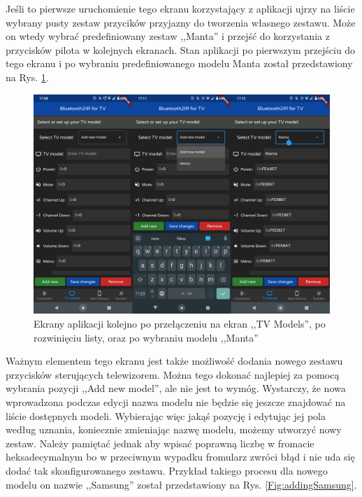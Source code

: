 \documentclass[12pt,twoside]{article}
\begin{document}
Jeśli to pierwsze uruchomienie tego ekranu korzystający z aplikacji ujrzy na liście wybrany pusty zestaw przycików przyjazny do tworzenia własnego zestawu. Może on wtedy wybrać predefiniowany zestaw ,,Manta'' i przejść do korzystania z przycisków pilota w kolejnych ekranach. Stan aplikacji po pierwszym przejściu do tego ekranu i po wybraniu predefiniowanego modelu Manta został przedstawiony na Rys. \ref*{Fig:choosingManta}.
\begin{figure}[ht]
   \centering
   \includegraphics[width=13cm]{images/choosingManta.png}
   \caption{Ekrany aplikacji kolejno po przełączeniu na ekran ,,TV Models'', po rozwinięciu listy, oraz po wybraniu modelu ,,Manta''}
   \label{Fig:choosingManta}
\end{figure}

Ważnym elementem tego ekranu jest także możliwość dodania nowego zestawu przycisków sterujących telewizorem. Można tego dokonać najlepiej za pomocą wybrania pozycji ,,Add new model'', ale nie jest to wymóg. Wystarczy, że nowa wprowadzona podczas edycji nazwa modelu nie będzie się jeszcze znajdować na liście dostępnych modeli. Wybierając więc jakąś pozycję i edytując jej pola według uznania, koniecznie zmieniając nazwę modelu, możemy utworzyć nowy zestaw. Należy pamiętać jednak aby wpisać poprawną liczbę w fromacie heksadecymalnym bo w przeciwnym wypadku fromularz zwróci błąd i nie uda się dodać tak skonfigurowanego zestawu. Przykład takiego procesu dla nowego modelu on nazwie ,,Samsung'' został przedstawiony na Rys. \ref*{Fig:addingSamsung}.
\end{document}
